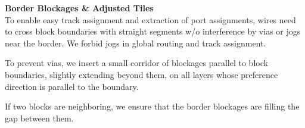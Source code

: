 \documentclass[a2paper]{bigsposter}
\begin{document}
\begin{blockrow}[3]
\begin{comment}
	

  \blocktitle{Previous work}
  Early port assignment algorithms were based on concentric circuits \cite{koren1972pin}
  and topological models \cite{brady1984approach}.
  Later, port assignment was combined with global routing
  \cite{cong1991pin, wang1991simultaneous, KoideWY-PinAssignmentWithGLobalRouting96, Chen+IntegratedFloorplanningAndInterconnectPlanning:1999},
  considering congestion (essentially) on the block borders using a so-called channel connection graph, and deriving
  port positions from global routing. Among these works,  \cite{wang1991simultaneous}  allows the creation of feedthrough routes.
  An integration of port assignment  with floorplanning for two-port nets is considered in  \cite{pedram1990floorplanning}.
  
  Minimum-cost flow algorithms for laying out all 2-port nets from one
  block to all others simultaneously were used \cite{xiang2003min}, also
  including buffer planning \cite{xiang2005algorithm}.
  
  According to \cite{Scheffer-IndustrialFloorplanningAndPrototyping08}, most of the above techniques are not applied in industrial floorplanning tools.
  Instead,  a rough timing-aware routing is done on a flattened netlist and pins are assigned
  where the boundaries are crossed \cite{Scheffer-IndustrialFloorplanningAndPrototyping08}.
  Boundary assertions are mostly created based on the zero slack algorithm
  \cite{nair+berman+hauge+yoffa:1989,Scheffer-IndustrialFloorplanningAndPrototyping08}.
  \blockbreak
\end{comment}
\blockbreak
 \textbf{Border Blockages \& Adjusted Tiles}\\
  To enable easy track assignment and extraction of port assignments,  wires
  need to  cross block boundaries with straight segments  w/o interference by vias or jogs near the border.
  We forbid jogs in global routing and track assignment.
  
 \begin{minipage}{0.6\blockwidth}
 	
 To prevent vias, we insert a small corridor of blockages parallel to
  block boundaries, slightly extending beyond them, on all layers whose preference direction is parallel
  to the boundary.
  
  If two blocks are neighboring, we ensure that the border blockages are filling the  gap between them.
  \end{minipage} 
\hfill
   \begin{minipage}{0.25\blockwidth}
   	

\end{minipage}
\end{blockrow}
\end{document}
